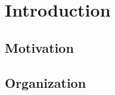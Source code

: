 \chapter{Introduction}
\label{ch:introduction}

  \section{Motivation}
  \label{sec:motivation}
  

  \section{Organization}
  \label{sec:organization}
  
